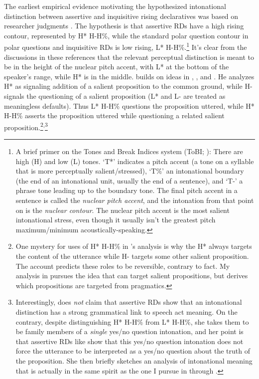 \documentclass[output=paper,colorlinks,citecolor=brown]{langscibook}
\begin{document}
	
	The earliest empirical evidence motivating the hypothesized intonational distinction between assertive and inquisitive rising declaratives was based on researcher judgments \citep{pierrehumbert80, pierrehumbert90, hirschberg95}. The hypothesis is that assertive RDs have a high rising contour, represented by H* H-H\%, while the standard polar question contour in polar questions and inquisitive RDs is low rising, L* H-H\%.\footnote{A brief primer on the Tones and Break Indices system (ToBI; \citealt{veilleux06}): There are high (H) and low (L) tones. `T*' indicates a pitch accent (a tone on a syllable that is more perceptually salient/stressed), `T\%' an intonational boundary (the end of an intonational unit, usually  the end of a sentence), and `T-' a phrase tone leading up to the boundary tone. The final pitch accent in a sentence is called the \emph{nuclear pitch accent}, and the intonation from that point on is the \emph{nuclear contour}. The nuclear pitch accent is the most salient intonational stress, even though it usually isn't the greatest pitch maximum/minimum acoustically-speaking.} It's clear from the discussions in these references that the relevant perceptual distinction is meant to be in the height of the nuclear pitch accent, with  L* at the bottom of the speaker's range, while H* is in the middle. \citet{truckenbrodt12} builds on ideas in \citet{pierrehumbert90}, \citet{hirschberg95}, and \citet{bartels99}. He analyzes H* as signaling addition of a salient proposition to the common ground, while H- signals the questioning of a salient proposition (L* and L- are treated as meaningless defaults). Thus L* H-H\% questions the proposition uttered, while H* H-H\% asserts the proposition uttered while questioning a related salient proposition.\footnote{One mystery for uses of H* H-H\% in \citeauthor{truckenbrodt12}'s analysis is why the H* always targets the content of the utterance while H- targets some other salient proposition. The account predicts these roles to be reversible, contrary to fact. My analysis in  pursues the idea that \rise can target salient propositions, but derives which propositions are targeted from pragmatics.}\textsuperscript{,}\footnote{Interestingly, \citet[62--63]{pierrehumbert80} does \emph{not} claim that assertive RDs show that an intonational distinction has a strong grammatical link to speech act meaning. On the contrary, despite distinguishing H* H-H\% from L* H-H\%, she takes them to be family members of a \emph{single} yes/no question intonation, and her point is that assertive RDs like  show that this yes/no question intonation does not force the utterance to be interpreted as a yes/no question about the truth of the proposition. She then briefly sketches  an analysis of intonational meaning that is actually in the same spirit as the one I pursue in  through .}
	
\end{document}
